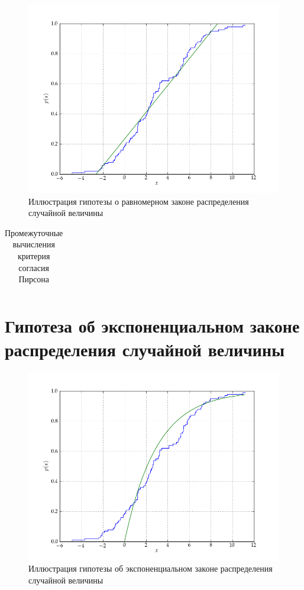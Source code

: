 \documentclass[a4paper,12pt]{report}
\begin{document}
\begin{figure}[h!] 
  \centering
  \includegraphics[width=0.8\linewidth]{../pic/sample_uniform.png}
  \caption{Иллюстрация гипотезы о равномерном законе распределения случайной величины}
\end{figure}

\begin{table}[h!]
  \renewcommand{\tabcolsep}{1em}
  \centering
  \begin{tabular}{|c|c|c|c|c|c|c|c|}
    \hline %
    
  \end{tabular}
  \caption{Промежуточные вычисления критерия согласия Пирсона}
\end{table}

\newpage

\section*{Гипотеза об экспоненциальном законе \\
  распределения случайной величины}

\begin{figure}[h!] 
  \centering
  \includegraphics[width=0.8\linewidth]{../pic/sample_exponential.png}
  \caption{Иллюстрация гипотезы об экспоненциальном законе распределения случайной величины}
\end{figure}
\end{document}
